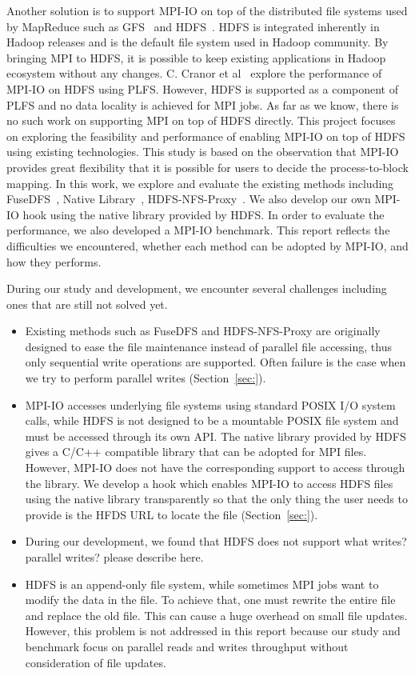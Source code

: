 Another solution is to support MPI-IO on top of the distributed file systems
used by MapReduce such as GFS~\cite{} and HDFS~\cite{hdfs}. HDFS is integrated
inherently in Hadoop releases and is the default file system used in Hadoop
community. By bringing MPI to HDFS, it is possible to keep existing applications
in Hadoop ecosystem without any changes. C. Cranor et al~\cite{CMU-PDL-12-115} explore the
performance of MPI-IO on HDFS using PLFS. However, HDFS is supported as a
component of PLFS and no data locality is achieved for MPI jobs. As far as we
know, there is no such work on supporting MPI on top of HDFS directly. This
project focuses on exploring the feasibility and performance of enabling MPI-IO
on top of HDFS using existing technologies. This study is based on the
observation that MPI-IO provides great flexibility that it is possible for users
to decide the process-to-block mapping. In this work, we explore and evaluate
the existing methods including FuseDFS~\cite{fuse}, Native Library~\cite{lib},
HDFS-NFS-Proxy~\cite{proxy}. We also develop our own MPI-IO hook using the
native library provided by HDFS. In order to evaluate the performance, we also
developed a MPI-IO benchmark. This report reflects the difficulties we
encountered, whether each method can be adopted by MPI-IO, and how they performs. 

During our study and development, we encounter several
challenges including ones that are still not solved yet.
\begin{itemize}
\item Existing methods such as FuseDFS and HDFS-NFS-Proxy are originally designed to ease the file
	maintenance instead of parallel file accessing, thus only sequential
	write operations are supported. Often failure is the case when we try to
	perform parallel writes (Section~\ref{sec:}). 
\item MPI-IO accesses underlying file systems using standard POSIX I/O system
	calls, while HDFS is not designed to be a mountable POSIX file system
	and must be accessed through its own API. The native library provided by
	HDFS gives a C/C++ compatible library that can be adopted for MPI files.
	However, MPI-IO does not have the corresponding support to access
	through the library. We develop a hook which enables MPI-IO to access
	HDFS files using the native library transparently so that the only thing
	the user needs to provide is the HFDS URL to locate the file
	(Section~\ref{sec:}).
\item During our development, we found that HDFS does not support 
{\color{red} what writes? parallel writes? please describe here. }
\item HDFS is an append-only file system, while sometimes MPI jobs want to
	modify the data in the file. To achieve that, one must rewrite the
	entire file and replace the old file. This can cause a huge overhead on
	small file updates. However, this problem is not addressed in this
	report because our study and benchmark focus on parallel reads and
	writes throughput without consideration of file updates.
\end{itemize}

